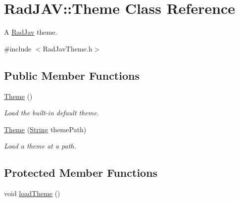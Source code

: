 \hypertarget{class_rad_j_a_v_1_1_theme}{}\section{Rad\+J\+AV\+:\+:Theme Class Reference}
\label{class_rad_j_a_v_1_1_theme}


A \hyperlink{class_rad_j_a_v_1_1_rad_jav}{Rad\+Jav} theme.  




{\ttfamily \#include $<$Rad\+Jav\+Theme.\+h$>$}

\subsection*{Public Member Functions}
\begin{DoxyCompactItemize}
\item 
\hyperlink{class_rad_j_a_v_1_1_theme_aa76ed51d5d7f3597b46d9b3359314de7}{Theme} ()
\begin{DoxyCompactList}\small\item\em Load the built-\/in default theme. \end{DoxyCompactList}\item 
\hyperlink{class_rad_j_a_v_1_1_theme_ad34f8c161ddb2f69bd182b36609211ce}{Theme} (\hyperlink{class_rad_j_a_v_1_1_string}{String} theme\+Path)
\begin{DoxyCompactList}\small\item\em Load a theme at a path. \end{DoxyCompactList}\end{DoxyCompactItemize}
\subsection*{Protected Member Functions}
\begin{DoxyCompactItemize}
\item 
void \hyperlink{class_rad_j_a_v_1_1_theme_ad94d2f3048ae0289215c18126bc2187e}{load\+Theme} ()
\end{DoxyCompactItemize}
